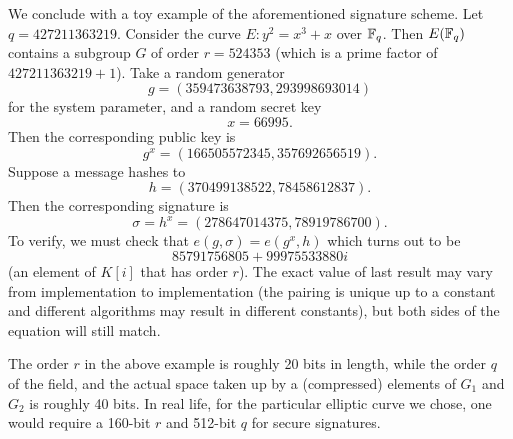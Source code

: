 We conclude with a toy example of the aforementioned signature scheme.
Let $q = 427211363219$.
Consider the curve $E : y^2 = x^3 + x$ over
$\mathbb{F}_q$. Then $E(\mathbb{F}_q)$ contains a subgroup
$G$ of order $r = 524353$ (which is a prime factor of $427211363219 + 1$).
Take a random generator
\[ g = (359473638793, 293998693014) \]
for the system parameter, and a random secret key
\[ x = 66995 . \]
Then the corresponding public key is
\[ g^x = (166505572345, 357692656519) . \]
Suppose a message hashes to
\[ h = (370499138522, 78458612837) . \]
Then the corresponding signature is
\[ \sigma = h^x = (278647014375, 78919786700) . \]
To verify, we must check that $e(g, \sigma) = e(g^x , h)$
which turns out to be
\[ 85791756805 + 99975533880i \]
(an element of $K[i]$ that has order $r$).
The exact value of last result may vary
from implementation to implementation (the pairing is unique up to a
constant and different algorithms may result in different constants),
but both sides of the equation will still match.

The order $r$ in the above example is roughly 20 bits in length,
while the order $q$ of the field, and the actual space taken up by
a (compressed) elements of $G_1$ and $G_2$ is roughly 40 bits. In real life,
for the particular elliptic curve we chose,
one would require a 160-bit $r$ and 512-bit $q$
for secure signatures.
